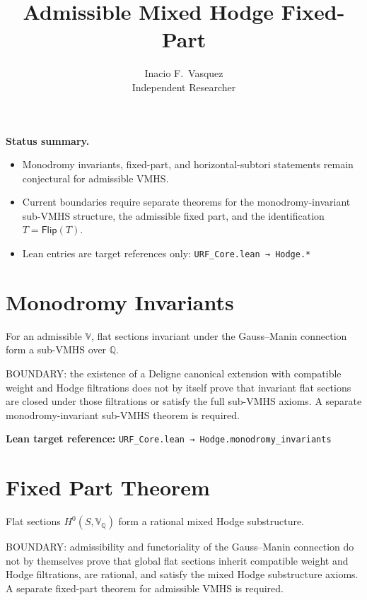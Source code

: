 \documentclass[11pt]{article}
\title{\textbf{Admissible Mixed Hodge Fixed-Part}}
\author{Inacio F.\ Vasquez \\ Independent Researcher}
\date{}
\theoremstyle{plain}
\theoremstyle{remark}
\newcommand{\Q}{\mathbb{Q}}
\newcommand{\mathbbV}{\mathbb{V}}
\begin{document}
\maketitle

\begin{center}
\textbf{Status summary.}
\begin{itemize}
\item Monodromy invariants, fixed-part, and horizontal-subtori statements remain conjectural for admissible VMHS.
\item Current boundaries require separate theorems for the monodromy-invariant sub-VMHS structure, the admissible fixed part, and the identification $T=\mathsf{Flip}(T)$.
\item Lean entries are target references only: \texttt{URF\_Core.lean → Hodge.*}
\end{itemize}
\end{center}

\tableofcontents

\section{Monodromy Invariants}

\begin{conjecture}\label{lem:hodge-monodromy}
For an admissible $\mathbbV$, flat sections invariant under the Gauss--Manin connection form a sub-VMHS over $\Q$.
\end{conjecture}

\noindent
BOUNDARY: the existence of a Deligne canonical extension with compatible
weight and Hodge filtrations does not by itself prove that invariant flat
sections are closed under those filtrations or satisfy the full sub-VMHS
axioms.  A separate monodromy-invariant sub-VMHS theorem is required.

\noindent
\textbf{Lean target reference:}
\texttt{URF\_Core.lean → Hodge.monodromy\_invariants}

\section{Fixed Part Theorem}

\begin{conjecture}\label{thm:hodge-fixed-part}
Flat sections $H^0(S, \mathbbV_\Q)$ form a rational mixed Hodge substructure.
\end{conjecture}

\noindent
BOUNDARY: admissibility and functoriality of the Gauss--Manin connection do not
by themselves prove that global flat sections inherit compatible weight and
Hodge filtrations, are rational, and satisfy the mixed Hodge substructure
axioms.  A separate fixed-part theorem for admissible VMHS is required.
\end{document}
